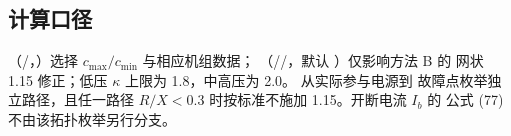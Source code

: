 \subsection{计算口径}
（/，）选择 $c_{\max}/c_{\min}$ 与相应机组数据；
（//，默认 ）仅影响方法 B 的
网状 1.15 修正；低压 $\kappa$ 上限为 1.8，中高压为 2.0。 从实际参与电源到
故障点枚举独立路径，且任一路径 $R/X<0.3$ 时按标准不施加 1.15。开断电流 $I_b$ 的
公式 (77) 不由该拓扑枚举另行分支。
